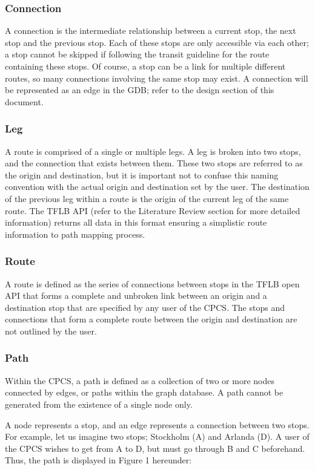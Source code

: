 \documentclass[12pt]{article}   	%
\begin{document}
\subsubsection{Connection}
A connection is the intermediate relationship between a current stop, the next stop and the previous stop. Each of these stops are only accessible via each other; a stop cannot be skipped if following the transit guideline for the route containing these stops. Of course, a stop can be a link for multiple different routes, so many connections involving the same stop may exist. A connection will be represented as an edge in the GDB; refer to the design section of this document.

\subsubsection{Leg}
A route is comprised of a single or multiple legs. A leg is broken into two stops, and the connection that exists between them. These two stops are referred to as the origin and destination, but it is important not to confuse this naming convention with the actual origin and destination set by the user. The destination of the previous leg within a route is the origin of the current leg of the same route. The TFLB API (refer to the Literature Review section for more detailed information) returns all data in this format ensuring a simplistic route information to path mapping process.

\subsubsection{Route}
A route is defined as the series of connections between stops in the TFLB open API that forms a complete and unbroken link between an origin and a destination stop that are specified by any user of the CPCS. The stops and connections that form a complete route between the origin and destination are not outlined by the user.

\subsubsection{Path}
Within the CPCS, a path is defined as a collection of two or more nodes connected by edges, or paths within the graph database. A path cannot be generated from the existence of a single node only.

A node represents a stop, and an edge represents a connection between two stops. For example, let us imagine two stops; Stockholm (A) and Arlanda (D). A user of the CPCS wishes to get from A to D, but must go through B and C beforehand. Thus, the path is displayed in Figure 1 hereunder:
\end{document}
